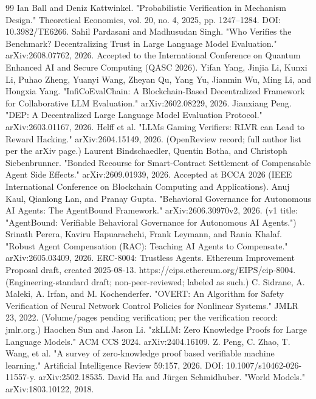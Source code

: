 \documentclass[11pt,a4paper]{article}
\begin{document}
\begin{thebibliography}{99}
 Ian Ball and Deniz Kattwinkel. "Probabilistic Verification in Mechanism Design." Theoretical Economics, vol. 20, no. 4, 2025, pp. 1247–1284. DOI: 10.3982/TE6266.
 Sahil Pardasani and Madhusudan Singh. "Who Verifies the Benchmark? Decentralizing Trust in Large Language Model Evaluation." arXiv:2608.07762, 2026. Accepted to the International Conference on Quantum Enhanced AI and Secure Computing (QASC 2026).
 Yifan Yang, Jinjia Li, Kunxi Li, Puhao Zheng, Yuanyi Wang, Zheyan Qu, Yang Yu, Jianmin Wu, Ming Li, and Hongxia Yang. "InfiCoEvalChain: A Blockchain-Based Decentralized Framework for Collaborative LLM Evaluation." arXiv:2602.08229, 2026.
 Jianxiang Peng. "DEP: A Decentralized Large Language Model Evaluation Protocol." arXiv:2603.01167, 2026.
 Helff et al. "LLMs Gaming Verifiers: RLVR can Lead to Reward Hacking." arXiv:2604.15149, 2026. (OpenReview record; full author list per the arXiv page.)
 Laurent Bindschaedler, Quentin Botha, and Christoph Siebenbrunner. "Bonded Recourse for Smart-Contract Settlement of Compensable Agent Side Effects." arXiv:2609.01939, 2026. Accepted at BCCA 2026 (IEEE International Conference on Blockchain Computing and Applications).
 Anuj Kaul, Qianlong Lan, and Pranay Gupta. "Behavioral Governance for Autonomous AI Agents: The AgentBound Framework." arXiv:2606.30970v2, 2026. (v1 title: "AgentBound: Verifiable Behavioral Governance for Autonomous AI Agents.")
 Srinath Perera, Kaviru Hapuarachchi, Frank Leymann, and Rania Khalaf. "Robust Agent Compensation (RAC): Teaching AI Agents to Compensate." arXiv:2605.03409, 2026.
 ERC-8004: Trustless Agents. Ethereum Improvement Proposal draft, created 2025-08-13. https://eips.ethereum.org/EIPS/eip-8004. (Engineering-standard draft; non-peer-reviewed; labeled as such.)
 C. Sidrane, A. Maleki, A. Irfan, and M. Kochenderfer. "OVERT: An Algorithm for Safety Verification of Neural Network Control Policies for Nonlinear Systems." JMLR 23, 2022. (Volume/pages pending verification; per the verification record: jmlr.org.)
 Haochen Sun and Jason Li. "zkLLM: Zero Knowledge Proofs for Large Language Models." ACM CCS 2024. arXiv:2404.16109.
 Z. Peng, C. Zhao, T. Wang, et al. "A survey of zero-knowledge proof based verifiable machine learning." Artificial Intelligence Review 59:157, 2026. DOI: 10.1007/s10462-026-11557-y. arXiv:2502.18535.
 David Ha and Jürgen Schmidhuber. "World Models." arXiv:1803.10122, 2018.

\end{thebibliography}
\end{document}
